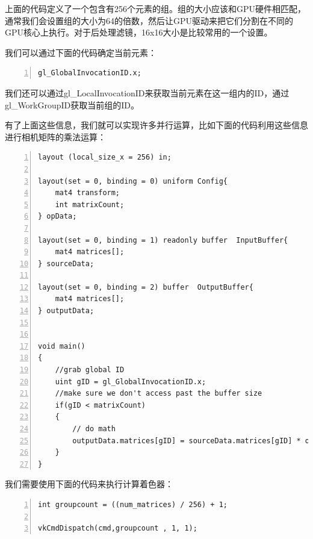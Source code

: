 \documentclass{ctexart}
\begin{document}
上面的代码定义了一个包含有256个元素的组。组的大小应该和GPU硬件相匹配，通常我们会设置组的大小为64的倍数，然后让GPU驱动来把它们分割在不同的GPU核心上执行。对于后处理滤镜，16x16大小是比较常用的一个设置。

我们可以通过下面的代码确定当前元素：

\begin{lstlisting}[language={[ANSI]C},keywordstyle=\color{blue!70},commentstyle=\color{red!50!green!50!blue!50},frame=shadowbox, rulesepcolor=\color{red!20!green!20!blue!20},basicstyle=\small,numbers=left, numberstyle=\tiny,breaklines=true]
gl_GlobalInvocationID.x;
\end{lstlisting}

我们还可以通过gl\_LocalInvocationID来获取当前元素在这一组内的ID，通过gl\_WorkGroupID获取当前组的ID。

有了上面这些信息，我们就可以实现许多并行运算，比如下面的代码利用这些信息进行相机矩阵的乘法运算：

\begin{lstlisting}[language={[ANSI]C},keywordstyle=\color{blue!70},commentstyle=\color{red!50!green!50!blue!50},frame=shadowbox, rulesepcolor=\color{red!20!green!20!blue!20},basicstyle=\small,numbers=left, numberstyle=\tiny,breaklines=true]
layout (local_size_x = 256) in;

layout(set = 0, binding = 0) uniform Config{
	mat4 transform;
	int matrixCount;
} opData;

layout(set = 0, binding = 1) readonly buffer  InputBuffer{
	mat4 matrices[];
} sourceData;

layout(set = 0, binding = 2) buffer  OutputBuffer{
	mat4 matrices[];
} outputData;


void main()
{
	//grab global ID
	uint gID = gl_GlobalInvocationID.x;
	//make sure we don't access past the buffer size
	if(gID < matrixCount)
	{
		// do math
		outputData.matrices[gID] = sourceData.matrices[gID] * opData.transform;
	}
}
\end{lstlisting}

我们需要使用下面的代码来执行计算着色器：

\begin{lstlisting}[language={[ANSI]C},keywordstyle=\color{blue!70},commentstyle=\color{red!50!green!50!blue!50},frame=shadowbox, rulesepcolor=\color{red!20!green!20!blue!20},basicstyle=\small,numbers=left, numberstyle=\tiny,breaklines=true]
int groupcount = ((num_matrices) / 256) + 1;

vkCmdDispatch(cmd,groupcount , 1, 1);
\end{lstlisting}
\end{document}
